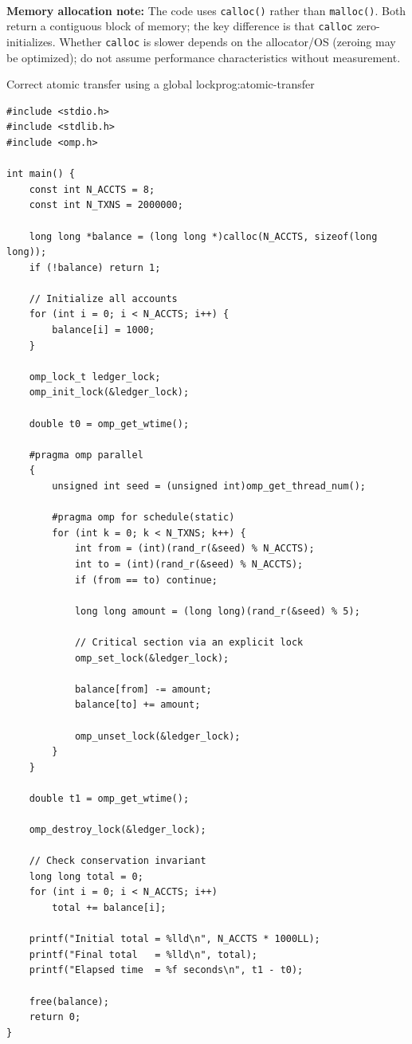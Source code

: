 \begin{ppnote}
\textbf{\\ Memory allocation note:} The code uses \texttt{calloc()} rather than \texttt{malloc()}. Both return a contiguous block of memory; the key difference is that \texttt{calloc} zero-initializes. Whether \texttt{calloc} is slower depends on the allocator/OS (zeroing may be optimized); do not assume performance characteristics without measurement.
\end{ppnote}

\begin{ppprogram}{Correct atomic transfer using a global lock}{prog:atomic-transfer}
\begin{lstlisting}[language=OpenMP]
#include <stdio.h>
#include <stdlib.h>
#include <omp.h>

int main() {
    const int N_ACCTS = 8;
    const int N_TXNS = 2000000;

    long long *balance = (long long *)calloc(N_ACCTS, sizeof(long long));
    if (!balance) return 1;

    // Initialize all accounts
    for (int i = 0; i < N_ACCTS; i++) {
        balance[i] = 1000;
    }

    omp_lock_t ledger_lock;
    omp_init_lock(&ledger_lock);

    double t0 = omp_get_wtime();

    #pragma omp parallel
    {
        unsigned int seed = (unsigned int)omp_get_thread_num();

        #pragma omp for schedule(static)
        for (int k = 0; k < N_TXNS; k++) {
            int from = (int)(rand_r(&seed) % N_ACCTS);
            int to = (int)(rand_r(&seed) % N_ACCTS);
            if (from == to) continue;

            long long amount = (long long)(rand_r(&seed) % 5);

            // Critical section via an explicit lock
            omp_set_lock(&ledger_lock);

            balance[from] -= amount;
            balance[to] += amount;

            omp_unset_lock(&ledger_lock);
        }
    }

    double t1 = omp_get_wtime();

    omp_destroy_lock(&ledger_lock);

    // Check conservation invariant
    long long total = 0;
    for (int i = 0; i < N_ACCTS; i++)
        total += balance[i];

    printf("Initial total = %lld\n", N_ACCTS * 1000LL);
    printf("Final total   = %lld\n", total);
    printf("Elapsed time  = %f seconds\n", t1 - t0);

    free(balance);
    return 0;
}
\end{lstlisting}
\end{ppprogram}

